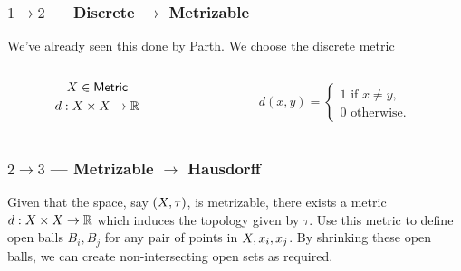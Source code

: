\begin{frame}
    \frametitle{\(1 \rightarrow 2\) --- Discrete \(\rightarrow\) Metrizable}


    We've already seen this done by Parth. We choose the discrete metric 

    \begin{columns}
        \begin{column}{0.5\textwidth}
            \begin{gather*}
                X \in \textsf{Metric}\\
                d : X \times X \to \mathbb{R} 
            \end{gather*}
        \end{column}
        \begin{column}{0.5\textwidth}
            \begin{gather*}
                d(x, y) = \begin{cases}
                    1 \text{ if } x \not = y,\\
                    0 \text{ otherwise.}
                \end{cases}
            \end{gather*}
        \end{column}
    \end{columns}

    \pause

    \begin{figure}
        \scalebox{1}{}
    \end{figure}

\end{frame}

\begin{frame}
    \frametitle{\(2 \rightarrow 3\) --- Metrizable \(\rightarrow\) Hausdorff}

    Given that the space, say \((X, \tau)\), is metrizable, there exists a
    metric \(d: X \times X \to \mathbb{R}\) which induces the topology given
    by \(\tau\). \pause
    Use this metric to define open balls \(B_i, B_j\) for any pair of points in
    \(X, x_i, x_j\). \pause By shrinking these open balls, we can create
    non-intersecting open sets as required.
    \pause
    \begin{figure}
        \scalebox{1}{}
    \end{figure}

\end{frame}

